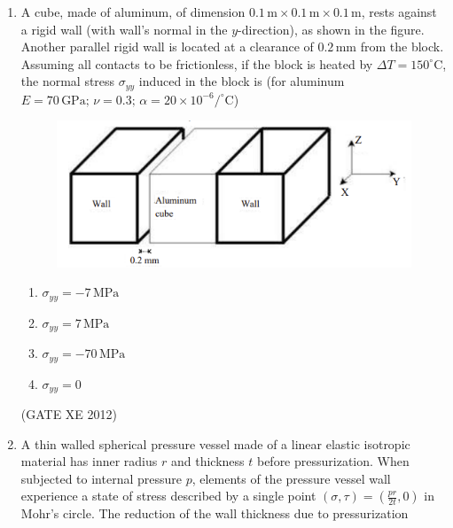 \documentclass[12pt]{article}
\begin{document}
\begin{enumerate}
\begin{multicols}{4}
\begin{enumerate}
\item 0.000 m
\item 0.100 m
\item 0.089 m
\item 0.109 m
\end{enumerate}
\end{multicols}
(GATE XE 2012)

\item A cube, made of aluminum, of dimension $0.1 \,\text{m} \times 0.1 \,\text{m} \times 0.1 \,\text{m}$, rests against a rigid wall (with wall's normal in the $y$-direction), as shown in the figure. Another parallel rigid wall is located at a clearance of $0.2 \,\text{mm}$ from the block. Assuming all contacts to be frictionless, if the block is heated by $\Delta T = 150^\circ \text{C}$, the normal stress $\sigma_{yy}$ induced in the block is (for aluminum $E = 70 \,\text{GPa}; \, \nu = 0.3; \, \alpha = 20 \times 10^{-6}/^\circ \text{C}$)

\begin{figure}[H]
    \centering
    \includegraphics[width=0.5\columnwidth]{figs/ass2_d_q14.png}
    \caption{}
    \label{fig:placeholder}
\end{figure}

\begin{enumerate}
\item $\sigma_{yy} = -7 \,\text{MPa}$
\item $\sigma_{yy} = 7 \,\text{MPa}$
\item $\sigma_{yy} = -70 \,\text{MPa}$
\item $\sigma_{yy} = 0$
\end{enumerate}
(GATE XE 2012)

\item A thin walled spherical pressure vessel made of a linear elastic isotropic material has inner radius $r$ and thickness $t$ before pressurization. When subjected to internal pressure $p$, elements of the pressure vessel wall experience a state of stress described by a single point $(\sigma, \tau) = \left(\tfrac{pr}{2t},0\right)$ in Mohr's circle. The reduction of the wall thickness due to pressurization


\end{enumerate}
\end{document}
